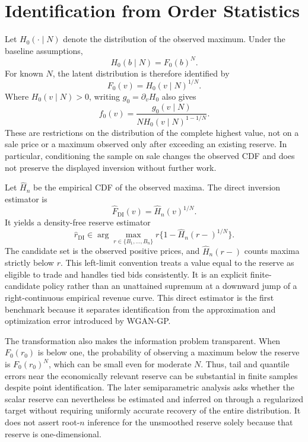\section{Identification from Order Statistics}

Let $H_0(\cdot\mid N)$ denote the distribution of the observed maximum. Under
the baseline assumptions,
\begin{equation}
H_0(b\mid N)=F_0(b)^N.
\end{equation}
For known $N$, the latent distribution is therefore identified by
\begin{equation}
F_0(v)=H_0(v\mid N)^{1/N}.
\end{equation}
Where $H_0(v\mid N)>0$, writing $g_0=\partial_v H_0$ also gives
\begin{equation}
f_0(v)=\frac{g_0(v\mid N)}{N H_0(v\mid N)^{1-1/N}}.
\end{equation}
These are restrictions on the distribution of the complete highest value,
not on a sale price or a maximum observed only after exceeding an existing
reserve. In particular, conditioning the sample on sale changes the observed
CDF and does not preserve the displayed inversion without further work.

Let $\widehat H_n$ be the empirical CDF of the observed maxima. The direct
inversion estimator is
\begin{equation}
\widehat F_{\mathrm{DI}}(v)=\widehat H_n(v)^{1/N}.
\end{equation}
It yields a density-free reserve estimator
\begin{equation}
\widehat r_{\mathrm{DI}}
\in\arg\max_{r\in\{B_1,\ldots,B_n\}}
r\{1-\widehat H_n(r-)^{1/N}\}.
\end{equation}
The candidate set is the observed positive prices, and $\widehat H_n(r-)$
counts maxima strictly below $r$. This left-limit convention treats a value
equal to the reserve as eligible to trade and handles tied bids consistently.
It is an explicit finite-candidate policy rather than an unattained supremum
at a downward jump of a right-continuous empirical revenue curve. This direct
estimator is the first benchmark because it separates identification from the
approximation and optimization error introduced by WGAN-GP.

The transformation also makes the information problem transparent. When
$F_0(r_0)$ is below one, the probability of observing a maximum below the
reserve is $F_0(r_0)^N$, which can be small even for moderate $N$. Thus, tail
and quantile errors near the economically relevant reserve can be substantial
in finite samples despite point identification. The later semiparametric
analysis asks whether the scalar reserve can nevertheless be estimated and
inferred on through a regularized target without requiring uniformly accurate
recovery of the entire distribution. It does not assert root-$n$ inference for
the unsmoothed reserve solely because that reserve is one-dimensional.

